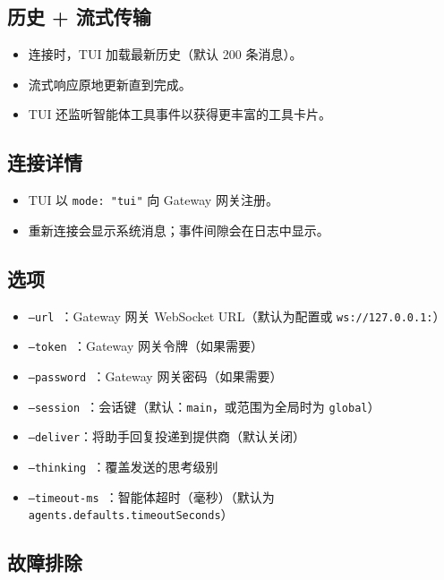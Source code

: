 \subsection{历史 + 流式传输}


\begin{itemize}
  \item 连接时，TUI 加载最新历史（默认 200 条消息）。
  \item 流式响应原地更新直到完成。
  \item TUI 还监听智能体工具事件以获得更丰富的工具卡片。
\end{itemize}


\subsection{连接详情}


\begin{itemize}
  \item TUI 以 \texttt{mode: "tui"} 向 Gateway 网关注册。
  \item 重新连接会显示系统消息；事件间隙会在日志中显示。
\end{itemize}


\subsection{选项}


\begin{itemize}
  \item \texttt{--url }：Gateway 网关 WebSocket URL（默认为配置或 \texttt{ws://127.0.0.1:}）
  \item \texttt{--token }：Gateway 网关令牌（如果需要）
  \item \texttt{--password }：Gateway 网关密码（如果需要）
  \item \texttt{--session }：会话键（默认：\texttt{main}，或范围为全局时为 \texttt{global}）
  \item \texttt{--deliver}：将助手回复投递到提供商（默认关闭）
  \item \texttt{--thinking }：覆盖发送的思考级别
  \item \texttt{--timeout-ms }：智能体超时（毫秒）（默认为 \texttt{agents.defaults.timeoutSeconds}）
\end{itemize}


\subsection{故障排除}


